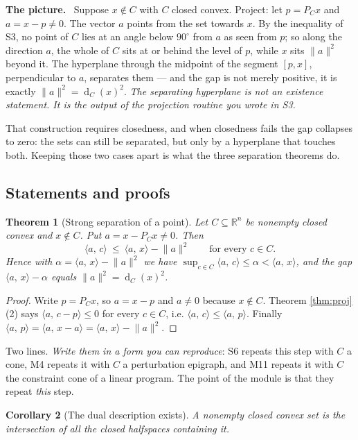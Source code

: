 \documentclass[11pt,a4paper]{article}
\newcommand{\mpart}[1]{\smallskip\noindent\textbf{#1}\ \ignorespaces}
\theoremstyle{definition}
\theoremstyle{plain}
\newtheorem{theorem}{Theorem}
\newtheorem{corollary}[theorem]{Corollary}
\theoremstyle{remark}
\newcommand{\R}{\mathbb{R}}
\newcommand{\ip}[2]{\langle #1,\, #2\rangle}
\newcommand{\norm}[1]{\lVert #1\rVert}
\newcommand{\proj}{P}
\DeclareMathOperator{\dist}{d}
\begin{document}
\mpart{The picture.} Suppose $x\notin C$ with $C$ closed convex. Project: let $p=\proj_Cx$ and
$a=x-p\ne0$. The vector $a$ points from the set towards $x$. By the inequality of S3, no point
of $C$ lies at an angle below $90^\circ$ from $a$ as seen from $p$; so along the direction $a$,
the whole of $C$ sits at or behind the level of $p$, while $x$ sits $\norm a^2$ beyond it. The
hyperplane through the midpoint of the segment $[p,x]$, perpendicular to $a$, separates them ---
and the gap is not merely positive, it is exactly $\norm a^2=\dist_C(x)^2$. \emph{The separating
hyperplane is not an existence statement. It is the output of the projection routine you wrote
in S3.}

That construction requires closedness, and when closedness fails the gap collapses to zero:
the sets can still be separated, but only by a hyperplane that touches both. Keeping those two
cases apart is what the three separation theorems do.

\subsection*{Statements and proofs}

\begin{theorem}[Strong separation of a point]
\label{thm:sep}
Let $C\subseteq\R^n$ be nonempty closed convex and $x\notin C$. Put $a=x-\proj_Cx\ne0$. Then
\[
\ip{a}{c}\ \le\ \ip{a}{x}-\norm a^2\qquad\text{for every }c\in C .
\]
Hence with $\alpha=\ip{a}{x}-\norm a^2$ we have $\sup_{c\in C}\ip{a}{c}\le\alpha<\ip{a}{x}$, and
the gap $\ip{a}{x}-\alpha$ equals $\norm a^2=\dist_C(x)^2$.
\end{theorem}

\begin{proof}
Write $p=\proj_Cx$, so $a=x-p$ and $a\ne0$ because $x\notin C$. Theorem \ref{thm:proj}(2) says
$\ip{a}{c-p}\le0$ for every $c\in C$, i.e. $\ip{a}{c}\le\ip{a}{p}$. Finally
$\ip{a}{p}=\ip{a}{x-a}=\ip{a}{x}-\norm a^2$.
\end{proof}

Two lines. \emph{Write them in a form you can reproduce}: S6 repeats this step with $C$ a cone,
M4 repeats it with $C$ a perturbation epigraph, and M11 repeats it with $C$ the constraint cone
of a linear program. The point of the module is that they repeat \emph{this} step.

\begin{corollary}[The dual description exists]
\label{cor:intersection}
A nonempty closed convex set is the intersection of all the closed halfspaces containing it.
\end{corollary}
\end{document}
